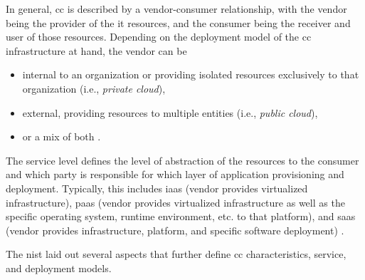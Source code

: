 In general, \ac{cc} is described by a vendor-consumer relationship, with the vendor being the provider of the \ac{it} resources, and the consumer being the receiver and user of those resources. Depending on the deployment model of the \ac{cc} infrastructure at hand, the vendor can be 
		
\begin{itemize}
	\item internal to an organization or providing isolated resources exclusively to that organization (i.e., \textit{private cloud}),
	\item external, providing resources to multiple entities (i.e., \textit{public cloud}),
	\item or a mix of both \cite{mell_nist_2011}. 
\end{itemize}  
		
The service level defines the level of abstraction of the resources to the consumer and which party is responsible for which layer of application provisioning and deployment. Typically, this includes \ac{iaas} (vendor provides virtualized infrastructure), \ac{paas} (vendor provides virtualized infrastructure as well as the specific operating system, runtime environment, etc. to that platform), and \ac{saas} (vendor provides infrastructure, platform, and specific software deployment) \cite{mell_nist_2011}. 
		
The \ac{nist} laid out several aspects that further define \ac{cc} characteristics, service, and deployment models.
		
